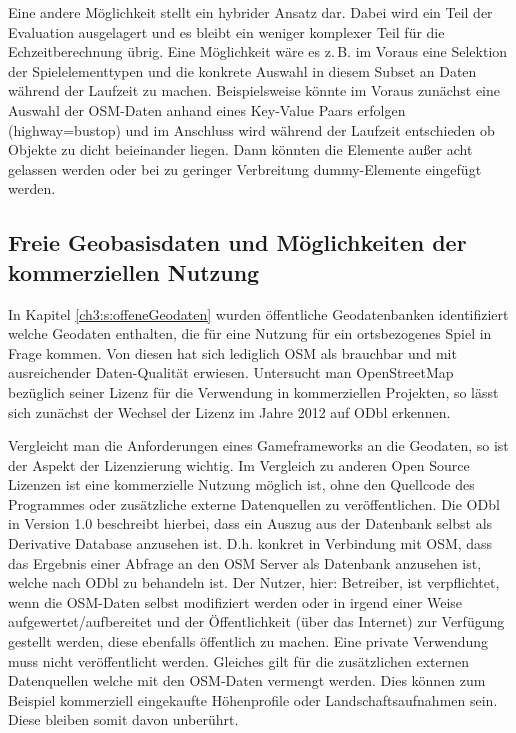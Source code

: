 Eine andere Möglichkeit stellt ein hybrider Ansatz dar. Dabei wird ein Teil der Evaluation ausgelagert und es bleibt ein weniger komplexer Teil für die Echzeitberechnung übrig. Eine Möglichkeit wäre es z.\,B. im Voraus eine Selektion der Spielelementtypen und die konkrete Auswahl in diesem Subset an Daten während der Laufzeit zu machen. Beispielsweise könnte im Voraus zunächst eine Auswahl der OSM-Daten anhand eines Key-Value Paars erfolgen (highway=bustop) und im Anschluss wird während der Laufzeit entschieden ob Objekte zu dicht beieinander liegen. Dann könnten die Elemente außer acht gelassen werden oder bei zu geringer Verbreitung dummy-Elemente eingefügt werden.

\subsection*{Freie Geobasisdaten und Möglichkeiten der kommerziellen Nutzung}

In Kapitel \ref{ch3:s:offeneGeodaten} wurden öffentliche Geodatenbanken identifiziert welche Geodaten enthalten, die für eine Nutzung für ein ortsbezogenes Spiel in Frage kommen. Von diesen hat sich lediglich OSM als brauchbar und mit ausreichender Daten-Qualität erwiesen. Untersucht man OpenStreetMap bezüglich seiner Lizenz für die Verwendung in kommerziellen Projekten, so lässt sich zunächst der Wechsel der Lizenz im Jahre 2012 auf ODbl erkennen.\cite{Ramthun.2012}

Vergleicht man die Anforderungen eines Gameframeworks an die Geodaten, so ist der Aspekt der Lizenzierung wichtig. Im Vergleich zu anderen Open Source Lizenzen ist eine kommerzielle Nutzung möglich ist, ohne den Quellcode des Programmes oder zusätzliche externe Datenquellen zu veröffentlichen.
Die ODbl in Version 1.0 beschreibt hierbei, dass ein Auszug aus der Datenbank selbst als Derivative Database anzusehen ist.\cite{ODbl.2014} D.h. konkret in Verbindung mit OSM, dass das Ergebnis einer Abfrage an den OSM Server als Datenbank anzusehen ist, welche nach ODbl zu behandeln ist. Der Nutzer, hier: Betreiber, ist verpflichtet, wenn die OSM-Daten selbst modifiziert werden oder in irgend einer Weise aufgewertet/aufbereitet und der Öffentlichkeit (über das Internet) zur Verfügung gestellt werden, diese ebenfalls öffentlich zu machen. Eine private Verwendung muss nicht veröffentlicht werden. Gleiches gilt für die zusätzlichen externen Datenquellen welche mit den OSM-Daten vermengt werden. Dies können zum Beispiel kommerziell eingekaufte Höhenprofile oder Landschaftsaufnahmen sein. Diese bleiben somit davon unberührt.

